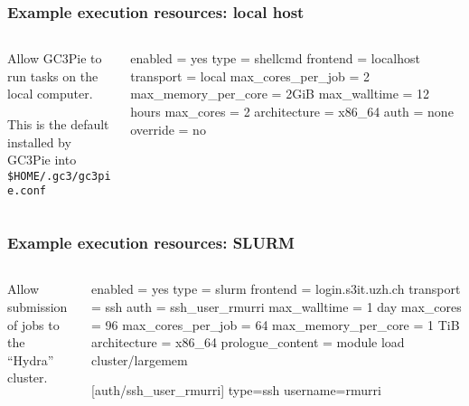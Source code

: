 \documentclass[english,serif,mathserif,usenames,dvipsnames]{beamer}
\begin{document}
\begin{frame}[fragile,label=resources]
  \frametitle{Example execution resources: local host}
  \begin{columns}[t]
    \begin{column}{0.5\textwidth}
      Allow GC3Pie to run tasks on the local computer.

      \+ This is the default installed by GC3Pie
      into \lstinline|$HOME/.gc3/gc3pie.conf| %
    \end{column}
    \begin{column}{0.5\textwidth}
  \begin{stdout}
enabled = yes
type = shellcmd
frontend = localhost
transport = local
max_cores_per_job = 2
max_memory_per_core = 2GiB
max_walltime = 12 hours
max_cores = 2
architecture = x86_64
auth = none
override = no
\end{stdout}
    \end{column}
  \end{columns}
\end{frame}


\begin{frame}[fragile]
  \frametitle{Example execution resources: SLURM}
  \begin{columns}[t]
    \begin{column}{0.5\textwidth}
      Allow submission of jobs to the ``Hydra'' cluster.
    \end{column}
    \begin{column}{0.5\textwidth}
\begin{stdout}
enabled = yes
type = slurm
frontend = login.s3it.uzh.ch
transport = ssh
auth = ssh_user_rmurri
max_walltime = 1 day
max_cores = 96
max_cores_per_job = 64
max_memory_per_core = 1 TiB
architecture = x86_64
prologue_content =
  module load cluster/largemem

[auth/ssh_user_rmurri]
type=ssh
username=rmurri
\end{stdout}
    \end{column}
  \end{columns}
\end{frame}
\end{document}

